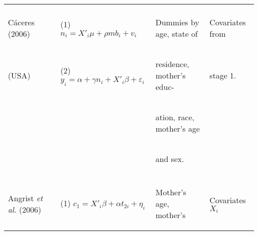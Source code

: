 \documentclass{article}[11pt,subeqn]
\begin{document}
\begin{spacing}{1.5}
\begin{center}
\begin{rotate}{90}
\begin{tabular}{lp{4mm}lll}
\\
\begin{footnotesize}\end{footnotesize}&\begin{footnotesize}\end{footnotesize}&\begin{footnotesize}\end{footnotesize}&\begin{footnotesize}\end{footnotesize}&\begin{footnotesize}\end{footnotesize}\\
C\'aceres (2006) & &
(1) $n_i=X'_i\mu + \rho mb_i + v_i$ &
\begin{small}Dummies by age, state of\end{small}&
\begin{small}Covariates from\end{small}
\\
(USA) & &
(2) $y_i=\alpha + \gamma n_i + X'_i\beta + \varepsilon_i$ &
\begin{small}residence, mother's educ- \end{small}&
\begin{small}stage 1.\end{small}
\\
& & &
\begin{small}ation, race, mother's age\end{small}&
\\
& & &
\begin{small}and sex.\end{small}&
\\
\begin{footnotesize}\end{footnotesize}&\begin{footnotesize}\end{footnotesize}&\begin{footnotesize}\end{footnotesize}&\begin{footnotesize}\end{footnotesize}&\begin{footnotesize}\end{footnotesize}\\
Angrist \emph{et al.} (2006) &  &
(1)  $c_1=X'_i\beta+\alpha t_{2i}+\eta_i$ &
\begin{small}Mother's age, mother's \end{small} & 
\begin{small}Covariates $X_i$\end{small}

\end{tabular}
\end{rotate}
\end{center}
\end{spacing}
\end{document}
